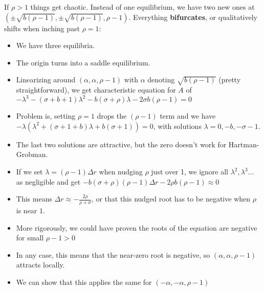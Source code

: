 \documentclass[11pt, oneside]{article}   	%
\begin{document}
If $\rho > 1$ things get chaotic.  Instead of one equilibrium, we have two new ones at $(\pm \sqrt{b(\rho - 1)}, \pm \sqrt{b(\rho - 1)}, \rho - 1)$. Everything \textbf{bifurcates}, or qualitatively shifts when inching past $\rho = 1$:
\begin{itemize}
\item We have three equilibria.
\item The origin turns into a saddle equilibrium.
\item Linearizing around   $(\alpha, \alpha , \rho - 1)$ with $\alpha$ denoting  $\sqrt{b(\rho - 1)}$ (pretty straightforward), we get characteristic equation for $A$ of $-\lambda^3 - (\sigma + b + 1)\lambda^2 - b(\sigma + \rho)\lambda - 2\sigma b(\rho - 1) = 0$
\item Problem is, setting $\rho = 1$ drops the $(\rho - 1)$ term and we have $-\lambda(\lambda^2+(\sigma +1 + b)\lambda + b(\sigma + 1)) = 0$, with solutions $\lambda = 0, -b, -\sigma -1$.
\item The last two solutions are attractive, but the zero doesn't work for Hartman-Grobman.
\item If we set $\lambda = (\rho - 1)\Delta r$ when nudging $\rho$ just over 1, we ignore all $\lambda^2, \lambda^3$... as negligible and get
 $-b(\sigma + \rho) (\rho - 1)\Delta r - 2\rho b(\rho - 1) \approx 0$
 \item This means $\Delta r \approx -\frac{2\rho}{\rho + \sigma}$, or that this nudged root has to be negative when $\rho$ is near $1$.
 \item More rigorously, we could have proven the roots of the equation are negative for small $\rho - 1 > 0$
 \item In any case, this means that the near-zero root is negative, so   $(\alpha, \alpha , \rho - 1)$ attracts locally.
 \item We can show that this applies the same for   $(-\alpha, -\alpha , \rho - 1)$ 
\end{itemize}
\end{document}
